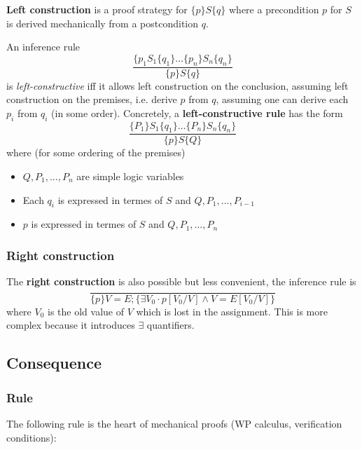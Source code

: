 \documentclass[12pt, a4paper]{book}
\begin{document}
    \textbf{Left construction} is a proof strategy for $\{ p \} S \{ q\}$ where
    a precondition $p$ for $S$ is derived mechanically from a postcondition $q$.
    \newline

    An inference rule
    $$
    \frac{\{ {p}_{1} {S}_{1} \{ {q}_{1} \} \ldots \{ {p}_{n} \} {S}_{n} \{ {q}_{n}\}}
    { \{ p \} S \{ q \}}
    $$
    is \textit{left-constructive} iff it allows left construction on the
    conclusion, assuming left construction on the premises, i.e. derive $p$
    from $q$, assuming one can derive each ${p}_{i}$ from $q_{i}$ (in some
    order). Concretely, a \textbf{left-constructive rule} has the form
    $$
    \frac{ \{ {P}_{1} \} {S}_{1} \{ {q}_{1} \} \ldots \{ {P}_{n} \} {S}_{n} \{ {q}_{n} \} }
    { \{ p \} S \{ Q \} }
    $$
    where (for some ordering of the premises)
    \begin{itemize}
        \item $Q, {P}_{1}, \ldots, {P}_{n}$ are simple logic variables
        \item Each ${q}_{i}$ is expressed in termes of $S$ and $Q, {P}_{1}, \ldots, {P}_{i-1}$
        \item $p$ is expressed in termes of $S$ and $Q, {P}_{1}, \ldots, {P}_{n}$
    \end{itemize}

    \subsubsection{Right construction}

    The \textbf{right construction} is also possible but less convenient, the
    inference rule is
    $$
    \frac{}
    { \{ p \} V=E; \{ \exists {V}_{0} \cdot p[{V}_{0}/V] \land V = E[{V}_{0}/V] \} }
    $$
    where ${V}_{0}$ is the old value of $V$ which is lost in the assignment.
    This is more complex because it introduces $\exists$ quantifiers.

    \subsection{Consequence}

    \subsubsection{Rule}

    The following rule is the heart of mechanical proofs (WP calculus,
    verification conditions):
\end{document}
